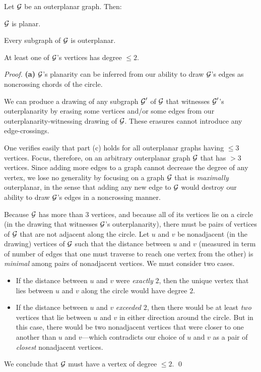 \begin{prop}
\label{thm:basic-outerplanar-stuff}
Let $\mbox{$\cal G$}$ be an outerplanar graph.  Then:

\smallskip

$\mbox{$\cal G$}$ is planar.


\smallskip

Every subgraph of $\mbox{$\cal G$}$ is outerplanar.

\smallskip

At least one of $\mbox{$\cal G$}$'s vertices has degree $\leq 2$.
\end{prop}

\begin{proof}
{\bf (a)}
$\mbox{$\cal G$}$'s planarity can be inferred from our ability to draw $\mbox{$\cal G$}$'s edges as noncrossing chords of the circle.

\medskip

We can produce a drawing of any subgraph  $\mbox{$\cal G$}'$ of $\mbox{$\cal G$}$ that witnesses $\mbox{$\cal G$}'$'s outerplanarity by erasing some vertices and/or some edges from our outerplanarity-witnessing drawing of $\mbox{$\cal G$}$.  These erasures cannot introduce any edge-crossings.

\medskip

One verifies easily that part (c) holds for all outerplanar graphs having $\leq 3$ vertices.  Focus, therefore, on an arbitrary outerplanar graph $\mbox{$\cal G$}$ that has $> 3$ vertices.  Since adding more edges to a graph cannot decrease the degree of any vertex, we lose no generality by focusing on a graph $\mbox{$\cal G$}$ that is {\em maximally} outerplanar, in the sense that adding any new edge to $\mbox{$\cal G$}$ would destroy our ability to draw $\mbox{$\cal G$}$'s edges in a noncrossing manner.

\smallskip

Because $\mbox{$\cal G$}$ has more than $3$ vertices, and because all of its vertices lie on a circle (in the drawing that witnesses $\mbox{$\cal G$}$'s outerplanarity), there must be pairs of vertices of $\mbox{$\cal G$}$ that are not adjacent along the circle.  Let $u$ and $v$ be nonadjacent (in the drawing) vertices of $\mbox{$\cal G$}$ such 
that the distance between $u$ and $v$ (measured in term of number of edges that one must traverse to reach one vertex from the other) is {\em minimal} among pairs of nonadjacent vertices.  We must consider two cases.
\begin{itemize}
\item
If the distance between $u$ and $v$ were {\em exactly} $2$, then the unique vertex that lies between $u$ and $v$ along the circle would have degree $2$.
\medskip\item
If the distance between $u$ and $v$ {\em exceeded} $2$, then there would be at least {\em two} vertices that lie between $u$ and $v$ in either direction around the circle.  But in this case, there would be two nonadjacent vertices that were closer to one another than $u$ and $v$---which contradicts our choice of $u$ and $v$ as a pair of {\em closest} nonadjacent vertices.
\end{itemize}
We conclude that $\mbox{$\cal G$}$ must have a vertex of degree $\leq 2$.  \qed
\end{proof}

